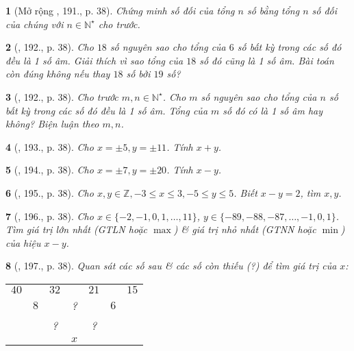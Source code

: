 \documentclass{article}
\newtheorem{baitoan}{}
\begin{document}
\begin{baitoan}[Mở rộng \cite{Tuyen_Toan_6}, 191., p. 38]
	Chứng minh số đối của tổng $n$ số bằng tổng $n$ số đối của chúng với $n\in\mathbb{N}^\star$ cho trước.
\end{baitoan}

\begin{baitoan}[\cite{Tuyen_Toan_6}, 192., p. 38]
	Cho $18$ số nguyên sao cho tổng của $6$ số bất kỳ trong các số đó đều là 1 số âm. Giải thích vì sao tổng của $18$ số đó cũng là 1 số âm. Bài toán còn đúng không nếu thay $18$ số bởi $19$ số?
\end{baitoan}

\begin{baitoan}[\cite{Tuyen_Toan_6}, 192., p. 38]
	Cho trước $m,n\in\mathbb{N}^\star$. Cho $m$ số nguyên sao cho tổng của $n$ số bất kỳ trong các số đó đều là 1 số âm. Tổng của $m$ số đó có là 1 số âm hay không? Biện luận theo $m,n$.
\end{baitoan}

\begin{baitoan}[\cite{Tuyen_Toan_6}, 193., p. 38]
	Cho $x = \pm5,y = \pm11$. Tính $x + y$.
\end{baitoan}

\begin{baitoan}[\cite{Tuyen_Toan_6}, 194., p. 38]
	Cho $x = \pm7,y = \pm20$. Tính $x - y$.
\end{baitoan}

\begin{baitoan}[\cite{Tuyen_Toan_6}, 195., p. 38]
	Cho $x,y\in\mathbb{Z},-3\le x\le3,-5\le y\le5$. Biết $x - y = 2$, tìm $x,y$.
\end{baitoan}

\begin{baitoan}[\cite{Tuyen_Toan_6}, 196., p. 38]
	Cho $x\in\{-2,-1,0,1,\ldots,11\}$, $y\in\{-89,-88,-87,\ldots,-1,0,1\}$. Tìm giá trị lớn nhất (GTLN hoặc $\max$) \& giá trị nhỏ nhất (GTNN hoặc $\min$) của hiệu $x - y$.
\end{baitoan}

\begin{baitoan}[\cite{Tuyen_Toan_6}, 197., p. 38]
	Quan sát các số sau \& các số còn thiếu (?) để tìm giá trị của $x$:
	\begin{table}[H]
		\centering
		\begin{tabular}{ccccccc}
			$40$ &  & $32$ &  & $21$ &  &  $15$ \\
			& $8$ &  & ? &  & $6$ &  \\
			&  & ? &  & ? &  &  \\
			&  &  & $x$ &  &  &  \\
		\end{tabular}
	\end{table}
\end{baitoan}
\end{document}

